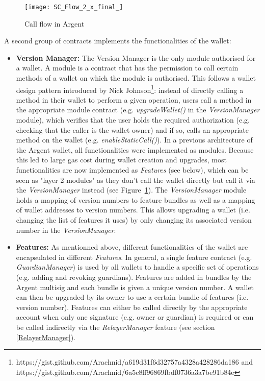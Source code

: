 \documentclass[12pt]{article}
\begin{document}
\begin{figure}[h]
    \label{fig:sc-flow}
    \texttt{[image: SC\_Flow\_2\_x\_final\_]}
    \caption{Call flow in Argent}
\end{figure}

A second group of contracts implements the functionalities of the wallet:
\begin{itemize}
    \item \textbf{Version Manager:} The Version Manager is the only module authorised for a wallet. A module is a contract that has the permission to call certain methods of a wallet on which the module is authorised. This follows a wallet design pattern introduced by Nick Johnson\footnote{https://gist.github.com/Arachnid/a619d31f6d32757a4328a428286da186 and https://gist.github.com/Arachnid/6a5c8ff96869fbdf0736a3a7be91b84e}: instead of directly calling a method in their wallet to perform a given operation, users call a method in the appropriate module contract (e.g. \emph{upgradeWallet()} in the \emph{VersionManager} module), which  verifies that the user holds the required authorization (e.g. checking that the caller is the wallet owner) and if so, calls an appropriate method on the wallet (e.g. \emph{enableStaticCall()}). 
    In a previous architecture of the Argent wallet, all functionalities were implemented as modules. Because this led to large gas cost during wallet creation and upgrades, most functionalities are now implemented as \emph{Features} (see below), which can be seen as "layer 2 modules" as they don't call the wallet directly but call it via the \emph{VersionManager} instead (see Figure~\ref{fig:sc-flow}). 
    The \emph{VersionManager} module holds a mapping of version numbers to feature bundles as well as a mapping of wallet addresses to version numbers. This allows upgrading a wallet (i.e. changing the list of features it uses) by only changing its associated version number in the \emph{VersionManager}.
    \item \textbf{Features:} As mentionned above, different functionalities of the wallet are encapsulated in different \emph{Features}. In general, a single feature contract (e.g. \emph{GuardianManager}) is used by all wallets to handle a specific set of operations (e.g. adding and revoking guardians). Features are added in bundles by the Argent multisig and each bundle is given a unique version number. A wallet can then be upgraded by its owner to use a certain bundle of features (i.e. version number).
    Features can either be called directly by the appropriate account when only one signature (e.g. owner or guardian) is required or can be called indirectly via the \emph{RelayerManager} feature (see section \ref{RelayerManager}).

\end{itemize}
\end{document}
